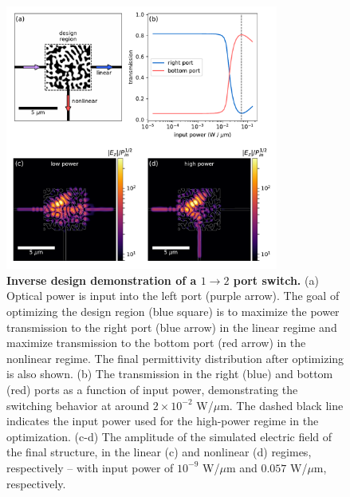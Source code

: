 \begin{figure}[t]
\centering
\includegraphics[width=0.8\textwidth]{figures/angler_T_port_11_1.pdf}
\caption{\label{fig:t_port} \textbf{Inverse design demonstration of a $1 \to 2$ port switch.}  (a) Optical power is input into the left port (purple arrow). The goal of optimizing the design region (blue square) is to maximize the power transmission to the right port (blue arrow) in the linear regime and maximize transmission to the bottom port (red arrow) in the nonlinear regime. The final permittivity distribution after optimizing is also shown. (b) The transmission in the right (blue) and bottom (red) ports as a function of input power, demonstrating the switching behavior at around $2\times10^{-2}$ W/$\mu$m.  The dashed black line indicates the input power used for the high-power regime in the optimization. (c-d) The amplitude of the simulated electric field of the final structure, in the linear (c) and nonlinear (d) regimes, respectively -- with input power of $10^{-9}$ W/$\mu$m and $0.057$ W/$\mu$m, respectively.}
\end{figure}

